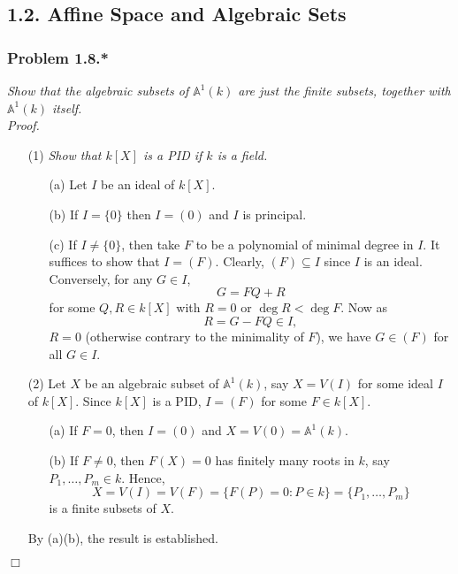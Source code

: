 \documentclass{article}
\begin{document}
\subsection*{1.2. Affine Space and Algebraic Sets \\}






\subsubsection*{Problem 1.8.*}
\emph{Show that the algebraic subsets of $\mathbb{A}^1(k)$ are just the finite subsets, together
with $\mathbb{A}^1(k)$ itself.} \\

\emph{Proof.}
\begin{enumerate}
\item[(1)]
  \emph{Show that $k[X]$ is a PID if $k$ is a field.}
  \begin{enumerate}
  \item[(a)]
    Let $I$ be an ideal of $k[X]$.

  \item[(b)]
    If $I = \{0\}$ then $I = (0)$ and $I$ is principal.

  \item[(c)]
    If $I \neq \{0\}$, then take $F$ to be a polynomial of minimal degree in $I$.
    It suffices to show that $I = (F)$.
    Clearly, $(F) \subseteq I$ since $I$ is an ideal.
    Conversely, for any $G \in I$,
    \[
      G = FQ + R
    \]
    for some $Q, R \in k[X]$ with $R = 0$ or $\deg R < \deg F$.
    Now as
    \[
      R = G - FQ \in I,
    \]
    $R = 0$ (otherwise contrary to the minimality of $F$),
    we have $G \in (F)$ for all $G \in I$.
  \end{enumerate}

\item[(2)]
  Let $X$ be an algebraic subset of $\mathbb{A}^1(k)$,
  say $X = V(I)$ for some ideal $I$ of $k[X]$.
  Since $k[X]$ is a PID, $I = (F)$ for some $F \in k[X]$.
  \begin{enumerate}
  \item[(a)]
    If $F = 0$, then $I = (0)$ and $X = V(0) = \mathbb{A}^1(k)$.

  \item[(b)]
    If $F \neq 0$, then $F(X) = 0$ has finitely many roots in $k$,
    say $P_1, \ldots, P_m \in k$.
    Hence,
    \[
      X = V(I) = V(F) = \{ F(P) = 0 : P \in k \}
      = \{ P_1, \ldots, P_m \}
    \]
    is a finite subsets of $X$.
  \end{enumerate}
  By (a)(b), the result is established.
\end{enumerate}
$\Box$\\
\end{document}
